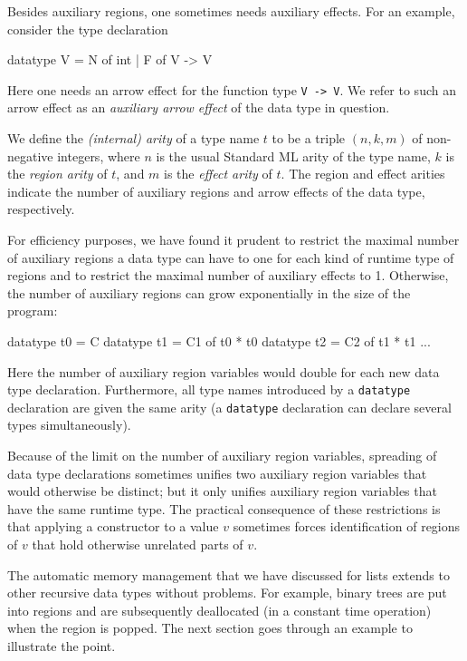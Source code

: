 \documentclass[12pt]{book}
\begin{document}
Besides auxiliary regions, one sometimes needs auxiliary effects.  For an
example, consider the type declaration
\begin{smlcode}
  datatype V = N of int | F of V -> V
\end{smlcode}
Here one needs an arrow effect for the function type \lstinline{V -> V}.  We
refer to such an arrow effect as an
%
%
%
{\em auxiliary arrow effect} of the data type in question.

We define the \emph{(internal) arity} of a type name $t$ to be a triple
$(n,k,m)$ of non-negative integers, where $n$ is the usual Standard ML
arity of the type name, $k$ is the
%
%
%
\emph{region arity} of $t$, and $m$ is the
%
%
%
\emph{effect arity} of $t$. The region and effect arities indicate the number of
auxiliary regions and arrow effects of the data type, respectively.

For efficiency purposes, we have found it prudent to restrict the maximal number
of auxiliary regions a data type can have to one for each kind of runtime type
of regions and to restrict the maximal number of auxiliary effects to 1.
Otherwise, the number of auxiliary regions can grow exponentially in the size of
the program:
\begin{smlcode}
  datatype t0 = C
  datatype t1 = C1 of t0 * t0
  datatype t2 = C2 of t1 * t1
  ...
\end{smlcode}
Here the number of auxiliary region variables would double for each new data
type declaration.  Furthermore, all type names introduced by a
\lstinline{datatype} declaration are given the same arity (a
\lstinline{datatype} declaration can declare several types simultaneously).

Because of the limit on the number of auxiliary region variables, spreading of
data type declarations sometimes unifies two auxiliary region variables that
would otherwise be distinct; but it only unifies auxiliary region variables that
have the same runtime type. The practical consequence of these restrictions is
that applying a constructor to a value $v$ sometimes forces identification of
regions of $v$ that hold otherwise unrelated parts of $v$.

The automatic memory management that we have discussed for lists extends to
other recursive data types without problems. For example, binary trees are put
into regions and are subsequently deallocated (in a constant time operation)
when the region is popped. The next section goes through an example to
illustrate the point.
\end{document}
